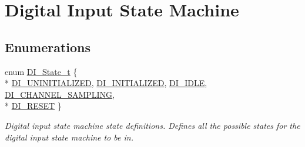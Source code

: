 \hypertarget{group__di__statemachine}{\section{Digital Input State Machine}
\label{group__di__statemachine}
}
\subsection*{Enumerations}
\begin{DoxyCompactItemize}
\item 
enum \hyperlink{group__di__statemachine_ga1ff79a885858a15562d8bd473c1efe24}{D\-I\-\_\-\-State\-\_\-t} \{ \\*
\hyperlink{group__di__statemachine_gga1ff79a885858a15562d8bd473c1efe24a8ae7603290feb31901a777c7225aa403}{D\-I\-\_\-\-U\-N\-I\-N\-I\-T\-I\-A\-L\-I\-Z\-E\-D}, 
\hyperlink{group__di__statemachine_gga1ff79a885858a15562d8bd473c1efe24aa0ac7a9cdfc538dd66f76f5b6f75f4b1}{D\-I\-\_\-\-I\-N\-I\-T\-I\-A\-L\-I\-Z\-E\-D}, 
\hyperlink{group__di__statemachine_gga1ff79a885858a15562d8bd473c1efe24a19f7283672ff38fff614237c05de6350}{D\-I\-\_\-\-I\-D\-L\-E}, 
\hyperlink{group__di__statemachine_gga1ff79a885858a15562d8bd473c1efe24a6b154c2051b086032c67aa91fa0ef163}{D\-I\-\_\-\-C\-H\-A\-N\-N\-E\-L\-\_\-\-S\-A\-M\-P\-L\-I\-N\-G}, 
\\*
\hyperlink{group__di__statemachine_gga1ff79a885858a15562d8bd473c1efe24ac285ee632a605767148a84ff1d5d1b61}{D\-I\-\_\-\-R\-E\-S\-E\-T}
 \}
\begin{DoxyCompactList}\small\item\em Digital input state machine state definitions. Defines all the possible states for the digital input state machine to be in. \end{DoxyCompactList}\end{DoxyCompactItemize}
